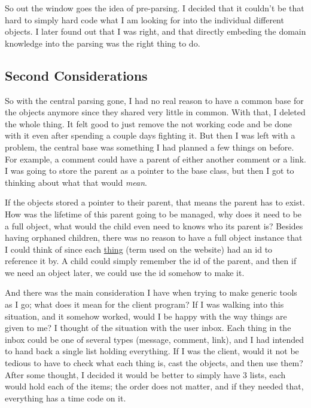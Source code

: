 \documentclass[12pt]{article}
\begin{document}
So out the window goes the idea of pre-parsing.
I decided that it couldn't be that hard to simply hard code what I am looking for into the individual different objects.
I later found out that I was right, and that directly embeding the domain knowledge into the parsing was the right thing to do.

\subsection{Second Considerations}

So with the central parsing gone, I had no real reason to have a common base for the objects anymore since they shared very little in common.
With that, I deleted the whole thing.
It felt good to just remove the not working code and be done with it even after spending a couple days fighting it.
But then I was left with a problem, the central base was something I had planned a few things on before.
For example, a comment could have a parent of either another comment or a link.
I was going to store the parent as a pointer to the base class, but then I got to thinking about what that would \textit{mean}.

If the objects stored a pointer to their parent, that means the parent has to exist.
How was the lifetime of this parent going to be managed, why does it need to be a full object, what would the child even need to knows who its parent is?
Besides having orphaned children, there was no reason to have a full object instance that I could think of since each \underline{thing} (term used on the website) had an id to reference it by.
A child could simply remember the id of the parent, and then if we need an object later, we could use the id somehow to make it.

And there was the main consideration I have when trying to make generic tools as I go; what does it mean for the client program?
If I was walking into this situation, and it somehow worked, would I be happy with the way things are given to me?
I thought of the situation with the user inbox.
Each thing in the inbox could be one of several types (message, comment, link), and I had intended to hand back a single list holding everything.
If I was the client, would it not be tedious to have to check what each thing is, cast the objects, and then use them?
After some thought, I decided it would be better to simply have 3 lists, each would hold each of the items; the order does not matter, and if they needed that, everything has a time code on it.
\end{document}
